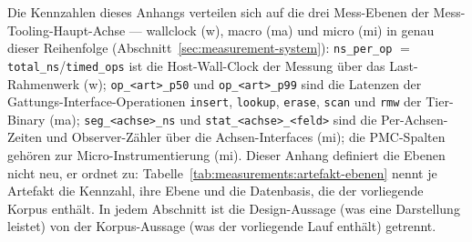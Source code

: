 Die Kennzahlen dieses Anhangs verteilen sich auf die drei Mess-Ebenen der Mess-Tooling-Haupt-Achse
--- wallclock (w), macro (ma) und micro (mi) in genau dieser Reihenfolge
(Abschnitt~\ref{sec:measurement-system}): \texttt{ns\_per\_op} $=$
\texttt{total\_ns}/\texttt{timed\_ops} ist die Host-Wall-Clock der Messung über das Last-Rahmenwerk
(w); \texttt{op\_<art>\_p50} und \texttt{op\_<art>\_p99} sind die Latenzen der
Gattungs-Interface-Operationen \texttt{insert}, \texttt{lookup}, \texttt{erase}, \texttt{scan} und
\texttt{rmw} der Tier-Binary (ma); \texttt{seg\_<achse>\_ns} und \texttt{stat\_<achse>\_<feld>}
sind die Per-Achsen-Zeiten und Observer-Zähler über die Achsen-Interfaces (mi); die PMC-Spalten
gehören zur Micro-Instrumentierung (mi). Dieser Anhang definiert die Ebenen nicht neu, er ordnet zu:
Tabelle~\ref{tab:measurements:artefakt-ebenen} nennt je Artefakt die Kennzahl, ihre Ebene und die
Datenbasis, die der vorliegende Korpus enthält. In jedem Abschnitt ist die Design-Aussage (was eine
Darstellung leistet) von der Korpus-Aussage (was der vorliegende Lauf enthält) getrennt.

